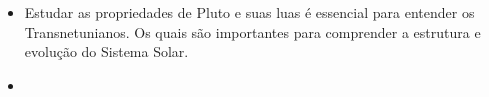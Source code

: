 \begin{frame}[c]{}




\begin{itemize}
	\item Estudar as propriedades de Pluto e suas luas é essencial para entender os Transnetunianos. Os quais são importantes para comprender a estrutura e evolução do Sistema Solar.
	\item 
\end{itemize}
\end{frame}

